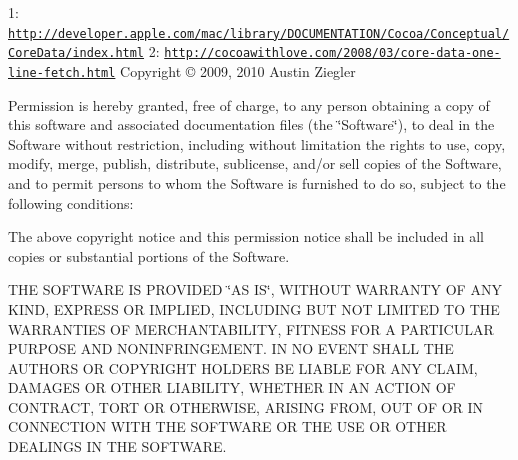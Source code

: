 1\-: \href{http://developer.apple.com/mac/library/DOCUMENTATION/Cocoa/Conceptual/CoreData/index.html}{\tt http\-://developer.\-apple.\-com/mac/library/\-D\-O\-C\-U\-M\-E\-N\-T\-A\-T\-I\-O\-N/\-Cocoa/\-Conceptual/\-Core\-Data/index.\-html} 2\-: \href{http://cocoawithlove.com/2008/03/core-data-one-line-fetch.html}{\tt http\-://cocoawithlove.\-com/2008/03/core-\/data-\/one-\/line-\/fetch.\-html} Copyright \copyright{} 2009, 2010 Austin Ziegler

Permission is hereby granted, free of charge, to any person obtaining a copy of this software and associated documentation files (the \char`\"{}\-Software\char`\"{}), to deal in the Software without restriction, including without limitation the rights to use, copy, modify, merge, publish, distribute, sublicense, and/or sell copies of the Software, and to permit persons to whom the Software is furnished to do so, subject to the following conditions\-:

The above copyright notice and this permission notice shall be included in all copies or substantial portions of the Software.

T\-H\-E S\-O\-F\-T\-W\-A\-R\-E I\-S P\-R\-O\-V\-I\-D\-E\-D \char`\"{}\-A\-S I\-S\char`\"{}, W\-I\-T\-H\-O\-U\-T W\-A\-R\-R\-A\-N\-T\-Y O\-F A\-N\-Y K\-I\-N\-D, E\-X\-P\-R\-E\-S\-S O\-R I\-M\-P\-L\-I\-E\-D, I\-N\-C\-L\-U\-D\-I\-N\-G B\-U\-T N\-O\-T L\-I\-M\-I\-T\-E\-D T\-O T\-H\-E W\-A\-R\-R\-A\-N\-T\-I\-E\-S O\-F M\-E\-R\-C\-H\-A\-N\-T\-A\-B\-I\-L\-I\-T\-Y, F\-I\-T\-N\-E\-S\-S F\-O\-R A P\-A\-R\-T\-I\-C\-U\-L\-A\-R P\-U\-R\-P\-O\-S\-E A\-N\-D N\-O\-N\-I\-N\-F\-R\-I\-N\-G\-E\-M\-E\-N\-T. I\-N N\-O E\-V\-E\-N\-T S\-H\-A\-L\-L T\-H\-E A\-U\-T\-H\-O\-R\-S O\-R C\-O\-P\-Y\-R\-I\-G\-H\-T H\-O\-L\-D\-E\-R\-S B\-E L\-I\-A\-B\-L\-E F\-O\-R A\-N\-Y C\-L\-A\-I\-M, D\-A\-M\-A\-G\-E\-S O\-R O\-T\-H\-E\-R L\-I\-A\-B\-I\-L\-I\-T\-Y, W\-H\-E\-T\-H\-E\-R I\-N A\-N A\-C\-T\-I\-O\-N O\-F C\-O\-N\-T\-R\-A\-C\-T, T\-O\-R\-T O\-R O\-T\-H\-E\-R\-W\-I\-S\-E, A\-R\-I\-S\-I\-N\-G F\-R\-O\-M, O\-U\-T O\-F O\-R I\-N C\-O\-N\-N\-E\-C\-T\-I\-O\-N W\-I\-T\-H T\-H\-E S\-O\-F\-T\-W\-A\-R\-E O\-R T\-H\-E U\-S\-E O\-R O\-T\-H\-E\-R D\-E\-A\-L\-I\-N\-G\-S I\-N T\-H\-E S\-O\-F\-T\-W\-A\-R\-E. 


